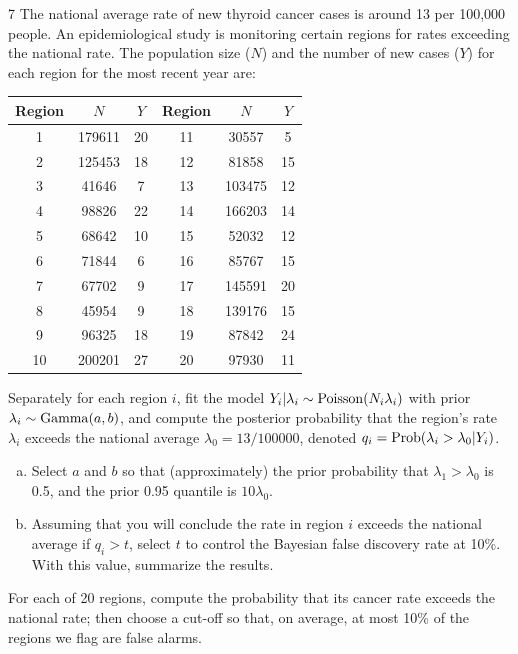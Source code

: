 \documentclass[11pt]{article}
\begin{document}
\begin{problem}{7}
The national average rate of new thyroid cancer cases is around 13 per 100,000 people. An epidemiological study is monitoring certain regions for rates exceeding the national rate. The population size ($N$) and the number of new cases ($Y$) for each region for the most recent year are:
\begin{center}
\small
\begin{tabular}{ccc|ccc}\toprule
Region & $N$ & $Y$ & Region & $N$ & $Y$\\\midrule
1 & 179611 & 20 & 11 & 30557 & 5\\
2 & 125453 & 18 & 12 & 81858 & 15\\
3 & 41646 & 7 & 13 & 103475 & 12\\
4 & 98826 & 22 & 14 & 166203 & 14\\
5 & 68642 & 10 & 15 & 52032 & 12\\
6 & 71844 & 6 & 16 & 85767 & 15\\
7 & 67702 & 9 & 17 & 145591 & 20\\
8 & 45954 & 9 & 18 & 139176 & 15\\
9 & 96325 & 18 & 19 & 87842 & 24\\
10 & 200201 & 27 & 20 & 97930 & 11\\\bottomrule
\end{tabular}
\end{center}
Separately for each region $i$, fit the model $Y_i|\lambda_i\sim\mathrm{Poisson}(N_i\lambda_i)$ with prior $\lambda_i\sim\mathrm{Gamma}(a,b)$, and compute the posterior probability that the region's rate $\lambda_i$ exceeds the national average $\lambda_0=13/100000$, denoted $q_i=\mathrm{Prob}(\lambda_i>\lambda_0|Y_i)$.
\begin{enumerate}[(a)]
\item Select $a$ and $b$ so that (approximately) the prior probability that $\lambda_1>\lambda_0$ is 0.5, and the prior 0.95 quantile is $10\lambda_0$.
\item Assuming that you will conclude the rate in region $i$ exceeds the national average if $q_i>t$, select $t$ to control the Bayesian false discovery rate at 10\%. With this value, summarize the results.
\end{enumerate}
\end{problem}

\begin{restate}
For each of 20 regions, compute the probability that its cancer rate exceeds the national rate; then choose a cut-off so that, on average, at most 10\% of the regions we flag are false alarms.
\end{restate}
\end{document}

